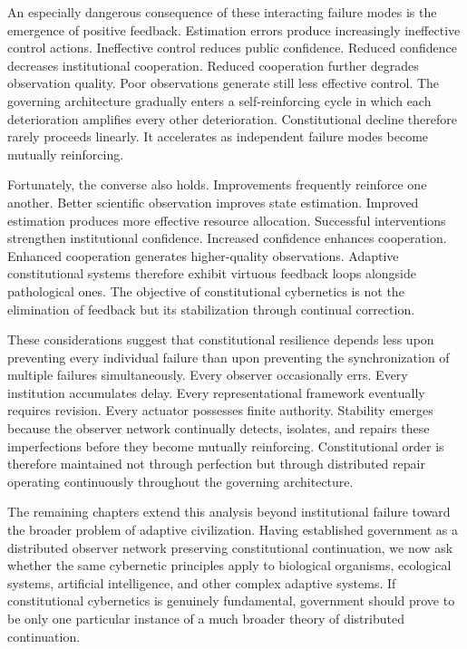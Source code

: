 \documentclass[12pt,a4paper]{article}
\begin{document}
An especially dangerous consequence of these interacting failure modes is the emergence of positive feedback. Estimation errors produce increasingly ineffective control actions. Ineffective control reduces public confidence. Reduced confidence decreases institutional cooperation. Reduced cooperation further degrades observation quality. Poor observations generate still less effective control. The governing architecture gradually enters a self-reinforcing cycle in which each deterioration amplifies every other deterioration. Constitutional decline therefore rarely proceeds linearly. It accelerates as independent failure modes become mutually reinforcing.

Fortunately, the converse also holds. Improvements frequently reinforce one another. Better scientific observation improves state estimation. Improved estimation produces more effective resource allocation. Successful interventions strengthen institutional confidence. Increased confidence enhances cooperation. Enhanced cooperation generates higher-quality observations. Adaptive constitutional systems therefore exhibit virtuous feedback loops alongside pathological ones. The objective of constitutional cybernetics is not the elimination of feedback but its stabilization through continual correction.

These considerations suggest that constitutional resilience depends less upon preventing every individual failure than upon preventing the synchronization of multiple failures simultaneously. Every observer occasionally errs. Every institution accumulates delay. Every representational framework eventually requires revision. Every actuator possesses finite authority. Stability emerges because the observer network continually detects, isolates, and repairs these imperfections before they become mutually reinforcing. Constitutional order is therefore maintained not through perfection but through distributed repair operating continuously throughout the governing architecture.

The remaining chapters extend this analysis beyond institutional failure toward the broader problem of adaptive civilization. Having established government as a distributed observer network preserving constitutional continuation, we now ask whether the same cybernetic principles apply to biological organisms, ecological systems, artificial intelligence, and other complex adaptive systems. If constitutional cybernetics is genuinely fundamental, government should prove to be only one particular instance of a much broader theory of distributed continuation.
\end{document}
